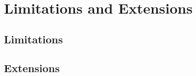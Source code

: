 
\section{Limitations and Extensions} %



\subsection{Limitations} %

\pagebreak

\subsection{Extensions}
